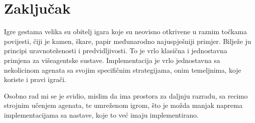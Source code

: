 \documentclass{foi}
\begin{document}
\chapter{Zaključak}

Igre gestama velika su obitelj igara koje su neovisno otkrivene u raznim točkama povijesti, čiji je kamen, škare, papir međunarodno najuspješniji primjer. Bilježe ju principi uravnoteženosti i predvidljivosti. To je vrlo klasična i jednostavna primjena za višeagentske sustave. Implementacija je vrlo jednostavna sa nekolicinom agenata sa svojim specifičnim strategijama, onim temeljnima, koje koriste i pravi igrači.

Osobno rad mi se je svidio, mislim da ima prostora za daljnju razradu, sa recimo strojnim učenjem agenata, te umreženom igrom, što je možda manjak naprema implementacijama sa nastave, koje to već imaju implementirano.

\printbibliography[title=Popis literature]

\listoffigures
{}

\appendix
\renewcommand{\thechapter}{\arabic{chapter}}
\end{document}
